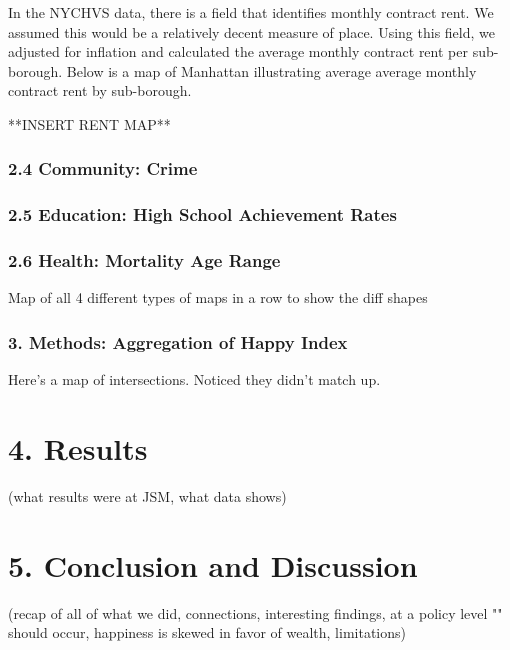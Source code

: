 \documentclass{article}\usepackage[]{graphicx}\usepackage[]{color}
\begin{document}
In the NYCHVS data, there is a field that identifies monthly contract rent. We assumed this would be a relatively decent measure of place. Using this field, we adjusted for inflation and calculated the average monthly contract rent per sub-borough. Below is a map of Manhattan illustrating average average monthly contract rent by sub-borough.

**INSERT RENT MAP**

\subsubsection*{2.4 Community: Crime}


\subsubsection*{2.5 Education: High School Achievement Rates}


\subsubsection*{2.6 Health: Mortality Age Range}


Map of all 4 different types of maps in a row to show the diff shapes

\subsubsection*{3. Methods: Aggregation of Happy Index}
Here's a map of intersections. Noticed they didn't match up.


\section*{4. Results} (what results were at JSM, what data shows)




\section*{5. Conclusion and Discussion} (recap of all of what we did, connections, interesting findings, at a policy level "" should occur, happiness is skewed in favor of wealth, limitations)
\end{document}
